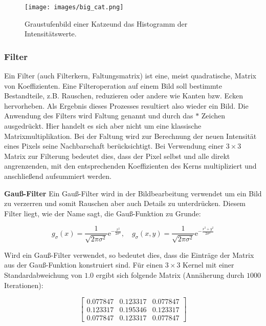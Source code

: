 \begin{figure}
	\centering
	\texttt{[image: images/big\_cat.png]}
	\caption[Graustufenbild einer Katze und das Histogramm der Intensitätswerte.]{Graustufenbild einer Katze\footnotemark und das Histogramm der Intensitätswerte.}
	\label{img:hist}
\end{figure}


\subsubsection{Filter} 
Ein Filter (auch Filterkern, Faltungsmatrix) ist eine, meist quadratische, Matrix von Koeffizienten. Eine Filteroperation auf einem Bild soll bestimmte Bestandteile, z.B. Rauschen, reduzieren oder andere wie Kanten bzw. Ecken hervorheben. Als Ergebnis dieses Prozesses resultiert also wieder ein Bild. Die Anwendung des Filters wird Faltung genannt und durch das $*$ Zeichen ausgedrückt. Hier handelt es sich aber nicht um eine klassische Matrixmultiplikation. Bei der Faltung wird zur Berechnung der neuen Intensität eines Pixels seine Nachbarschaft berücksichtigt. Bei Verwendung einer $3 \times 3$ Matrix zur Filterung bedeutet dies, dass der Pixel selbst und alle direkt angrenzenden, mit den entsprechenden Koeffizienten des Kerns multipliziert und anschließend aufsummiert werden. 

\textbf{Gauß-Filter}
Ein Gauß-Filter wird in der Bildbearbeitung verwendet um ein Bild zu verzerren und somit Rauschen aber auch Details zu unterdrücken. Diesem Filter liegt, wie der Name sagt, die Gauß-Funktion zu Grunde:

$$
g_{\sigma}(x)=\frac{1}{\sqrt{2\pi\sigma^{2}}}\mathrm{e}^{-\frac{x^{2}}{2\sigma^{2}}}, \quad g_{\sigma}(x, y) = \frac{1}{\sqrt{2\pi\sigma^{2}}}\mathrm{e}^{-\frac{x^{2} + y^{2}}{2\sigma^{2}}}
$$

Wird ein Gauß-Filter verwendet, so bedeutet dies, dass die Einträge der Matrix aus der Gauß-Funktion konstruiert sind. Für einen $3 \times 3$ Kernel mit einer Standardabweichung von $1.0$ ergibt sich folgende Matrix (Annäherung durch $1000$ Iterationen):

$$
\begin{bmatrix}
0.077847	& 0.123317	& 0.077847	\\
0.123317	& 0.195346	& 0.123317	\\
0.077847	& 0.123317	& 0.077847
\end{bmatrix}
$$ 

